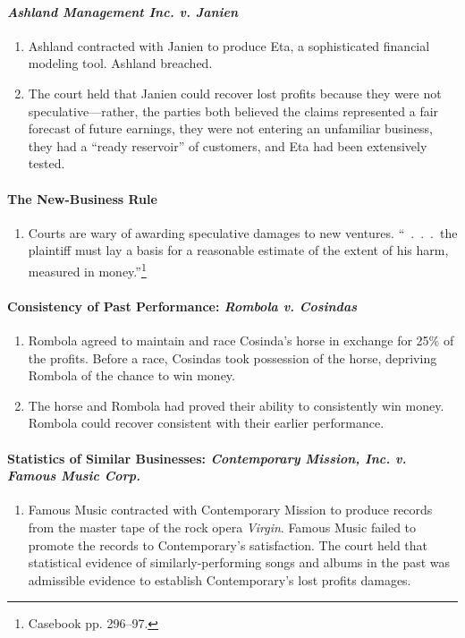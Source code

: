 \paragraph{\emph{Ashland Management Inc. v. Janien}}

\begin{enumerate}
    \item Ashland contracted with Janien to produce Eta, a sophisticated 
    financial modeling tool. Ashland breached.
    \item The court held that Janien could recover lost profits because they 
    were not speculative---rather, the parties both believed the claims 
    represented a fair forecast of future earnings, they were not entering an 
    unfamiliar business, they had a ``ready reservoir'' of customers, and Eta 
    had been extensively tested.
\end{enumerate}

\paragraph{The New-Business Rule}

\begin{enumerate}
    \item Courts are wary of awarding speculative damages to new ventures. 
    ``~.~.~.~the plaintiff must lay a basis for a reasonable estimate of the 
    extent of his harm, measured in money.''\footnote{Casebook pp. 296--97.}
\end{enumerate}

\paragraph{Consistency of Past Performance: \emph{Rombola v. Cosindas}}

\begin{enumerate}
    \item Rombola agreed to maintain and race Cosinda's horse in exchange for 
    25\% of the profits. Before a race, Cosindas took possession of the horse, 
    depriving Rombola of the chance to win money.
    \item The horse and Rombola had proved their ability to consistently win 
    money. Rombola could recover consistent with their earlier performance.
\end{enumerate}

\paragraph{Statistics of Similar Businesses: \emph{Contemporary Mission, Inc. 
v. Famous Music Corp.}}
\begin{enumerate}
    \item Famous Music contracted with Contemporary Mission to produce records 
    from the master tape of the rock opera \emph{Virgin}. Famous Music failed 
    to promote the records to Contemporary's satisfaction. The court held that 
    statistical evidence of similarly-performing songs and albums in the past 
    was admissible evidence to establish Contemporary's lost profits damages.
\end{enumerate}


